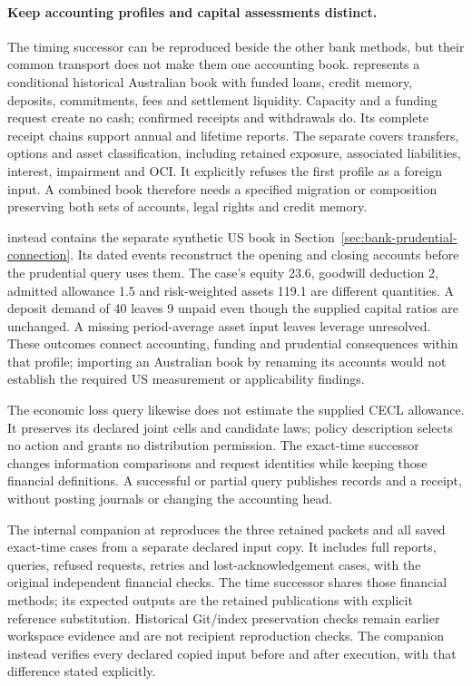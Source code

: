 \paragraph{Keep accounting profiles and capital assessments distinct.}
The timing successor can be reproduced beside the other bank methods, but
their common transport does not make them one accounting book.
 represents a conditional historical Australian book
with funded loans, credit memory, deposits, commitments, fees and settlement
liquidity. Capacity and a funding request create no cash; confirmed receipts
and withdrawals do. Its complete receipt chains support annual and lifetime
reports. The separate  covers transfers, options and
asset classification, including retained exposure, associated liabilities,
interest, impairment and OCI. It explicitly refuses the first profile as a
foreign input. A combined book therefore needs a specified migration or
composition preserving both sets of accounts, legal rights and credit memory.

 instead contains the separate synthetic US book in
Section~\ref{sec:bank-prudential-connection}. Its dated events reconstruct the
opening and closing accounts before the prudential query uses them. The case's
equity 23.6, goodwill deduction 2, admitted allowance 1.5 and risk-weighted
assets 119.1 are different quantities. A deposit demand of 40 leaves 9 unpaid
even though the supplied capital ratios are unchanged. A missing period-average
asset input leaves leverage unresolved. These outcomes connect accounting,
funding and prudential consequences within that profile; importing an
Australian book by renaming its accounts would not establish the required
US measurement or applicability findings.

The economic loss query likewise does not estimate the supplied CECL allowance.
It preserves its declared joint cells and candidate laws; policy description
selects no action and grants no distribution permission. The exact-time
successor changes information comparisons and request identities while keeping
those financial definitions. A successful or partial query publishes records
and a receipt, without posting journals or changing the accounting head.

The internal companion at  reproduces the
three retained packets and all saved exact-time cases from a separate declared
input copy. It includes full reports, queries, refused requests, retries and
lost-acknowledgement cases, with the original independent financial checks.
The time successor shares those financial methods; its expected outputs are
the retained publications with explicit reference substitution. Historical
Git/index preservation checks remain earlier workspace evidence and are not
recipient reproduction checks. The companion instead verifies every declared
copied input before and after execution, with that difference stated explicitly.

